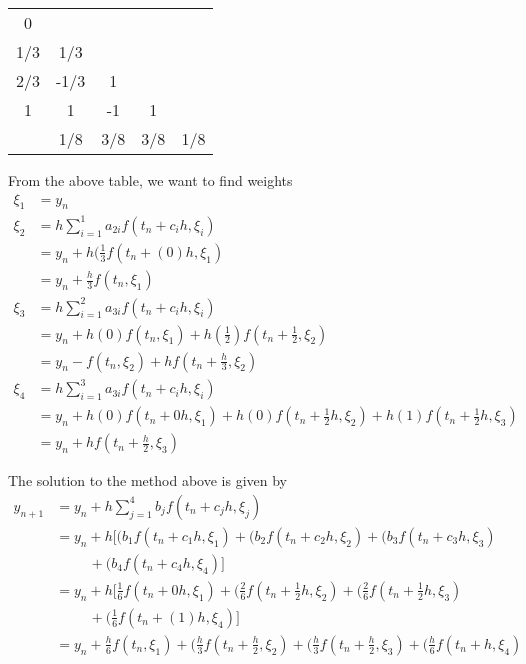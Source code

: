 \documentclass[12pt,a4paper]{article}
\begin{document}
\begin{center}
\begin{tabular}{c|cccc}
0\\
1/3&1/3\\
2/3&-1/3&1\\
1&1&-1&1\\
\hline
&1/8&3/8&3/8&1/8
\end{tabular}
\end{center}

From the above table, we want to find weights 
\begin{align*}
\xi_1 &= y_n \\
\xi_2 &= h \sum_{i=1}^{1}a_{2i}f(t_n + c_ih , \xi_i ) \\
&= y_n + h (\frac{1}{3}f(t_n +(0)h, \xi_1) \\
&= y_n + \frac{h}{3}f(t_n, \xi_1) \\
\xi_3 &= h \sum_{i=1}^{2}a_{3i}f(t_n + c_ih , \xi_i ) \\
&= y_n + h (0) f(t_n,\xi_1) + h (\frac{1}{2})f(t_n + \frac{1}{2}, \xi_2) \\
&= y_n - f(t_n, \xi_2)+ h f(t_n +\frac{h}{3}, \xi_2) \\
\xi_4 &= h \sum_{i=1}^{3}a_{3i}f(t_n + c_ih , \xi_i ) \\
&= y_n + h (0) f(t_n + 0h ,\xi_1) + h(0)f(t_n + \frac{1}{2}h ,\xi_2) + h(1)f(t_n + \frac{1}{2}h ,\xi_3)\\
&= y_n + h f(t_n + \frac{h}{2}, \xi_3) 
\end{align*}

The solution to the method above is given by 
\begin{align*}
y_{n+1} &= y_n + h \sum_{j=1}^{4}b_jf(t_n + c_jh , \xi_j ) \\
&= y_n + h [(b_1f(t_n + c_1h , \xi_1 ) + (b_2f(t_n + c_2h , \xi_2 )+ (b_3f(t_n + c_3h , \xi_3 ) \\
&\hspace{1cm} + (b_4f(t_n + c_4h , \xi_4 )] \\
& = y_n + h [\frac{1}{6} f(t_n + 0h , \xi_1 ) + (\frac{2}{6}f(t_n + \frac{1}{2}h , \xi_2 )+ (\frac{2}{6}f(t_n + \frac{1}{2}h , \xi_3 ) \\
&\hspace{1cm} + (\frac{1}{6}f(t_n + (1)h , \xi_4 )] \\
&= y_n + \frac{h}{6} f(t_n , \xi_1 ) + (\frac{h}{3}f(t_n + \frac{h}{2} , \xi_2 )+ (\frac{h}{3}f(t_n + \frac{h}{2} , \xi_3 )+ (\frac{h}{6}f(t_n + h , \xi_4 ) 
\end{align*}
\end{document}
